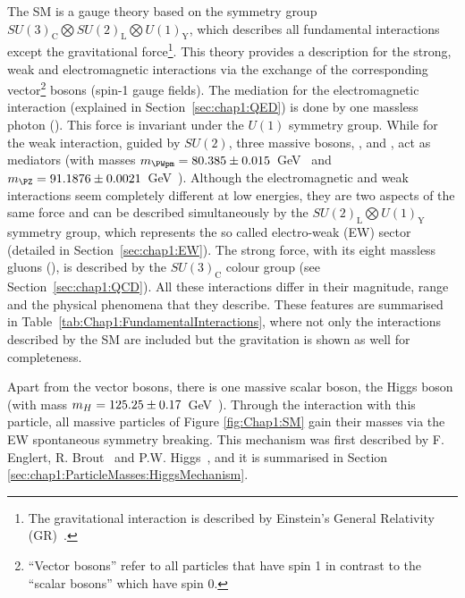 The SM is a gauge theory based on the symmetry group $SU(3)_\text{C} \bigotimes SU(2)_{\text{L}} \bigotimes U(1)_{\text{Y}}$, which
describes all fundamental interactions except the gravitational force\footnote{The gravitational interaction is described by Einstein's General Relativity (GR)~\cite{Einstein:1916vd}.}.
This theory provides a description for the strong, weak and electromagnetic interactions via the exchange of the corresponding
vector\footnote{``Vector bosons'' refer to all particles that have spin 1 in contrast to the ``scalar bosons'' which have spin 0.} bosons (spin-1 gauge fields).
The mediation for the electromagnetic interaction (explained in Section~\ref{sec:chap1:QED}) 
is done by one massless photon (\Pgamma).  This force is invariant under the $U(1)$ symmetry group.
While for the weak interaction, guided by $SU(2)$, three massive bosons,
\PWplus, \PWminus and \PZ, act as mediators (with masses 
$m_{\PWpm}= 80.385 \pm 0.015$~GeV~\cite{ATLAS:2017rzl} and 
$m_{\PZ}=  91.1876 \pm 0.0021$~GeV~\cite{ALEPH:2005ab}). 
Although the electromagnetic and weak interactions seem completely different at low energies, they are two aspects of the same force and
can be described simultaneously by the $SU(2)_\text{L} \bigotimes U(1)_\text{Y}$ 
symmetry group, which represents the so called electro-weak (EW) sector (detailed in Section~\ref{sec:chap1:EW}).
The strong force, with its eight massless gluons (\Pgluon), is described by the $SU(3)_\text{C}$ colour group (see Section~\ref{sec:chap1:QCD}). 
All these interactions differ in their magnitude, range and the physical phenomena that they describe. These features
are summarised in Table~\ref{tab:Chap1:FundamentalInteractions}, where 
not only the interactions described by the SM are included but the
gravitation is shown as well for completeness.  

Apart from the vector bosons, there is one massive scalar boson, the
 Higgs boson (with mass $m_{H} = 125.25\pm0.17$~GeV~\cite{Workman:2022ynf}). %
Through the interaction with this particle, all massive particles of Figure 
\ref{fig:Chap1:SM} gain their masses via the EW spontaneous symmetry breaking.
This mechanism was first described by F. Englert, R. Brout~\cite{PhysRevLett.13.321} 
and P.W. Higgs~\cite{PhysRevLett.13.508}, and it is summarised in Section 
\ref{sec:chap1:ParticleMasses:HiggsMechanism}. 

